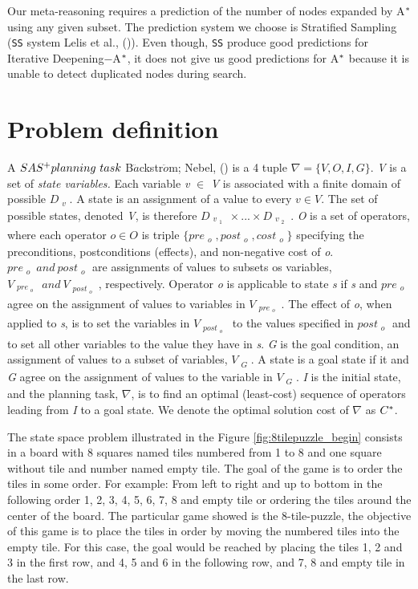 Our meta-reasoning requires a prediction of the number of nodes expanded by A$\sp{*}$ using any given subset. The prediction system we choose is Stratified Sampling (\texttt{SS} system Lelis et al., (\citeyear{lelis2013predicting})). Even though, \texttt{SS} produce good predictions for Iterative Deepening$-$A$\sp{*}$, it does not give us good predictions for A$\sp{*}$ because it is unable to detect duplicated nodes during search.

\section{Problem definition}

A $SAS\sp{+} planning\ task$ B$\ddot{a}$ckstr$\ddot{o}$m; Nebel, (\citeyear{backstrom1995complexity}) is a 4 tuple $\nabla = \{V, O, I, G\}.$ \textit{V} is a set of \textit{state variables.} Each variable \textit{v} $\in$ \textit{V} is associated with a finite domain of possible $D_{\substack{v}}$. A state is an assignment of a value to every $v \in V.$ The set of possible states, denoted \textit{V}, is therefore $D_{\substack{v_{\substack{1}}}}    \times ... \times D_{\substack{v_{\substack{2}}}}$. \textit{O} is a set of operators, where each operator $o \in O$ is triple $\{pre_{\substack{o}} , post_{\substack{o}}, cost_{\substack{o}}\}$ specifying the preconditions, postconditions (effects), and non-negative cost of \textit{o}. $pre_{\substack{o}}\ and\ post_{\substack{o}}$ are assignments of values to subsets os variables, $V_{\substack{pre_{\substack{o}}}}\ and\ V_{\substack{post_{\substack{o}}}}$, respectively. Operator \textit{o} is applicable to state \textit{s} if \textit{s} and $pre_{\substack{o}}$ agree on the assignment of values to variables in $V_{\substack{pre_{\substack{o}}}}$. The effect of \textit{o}, when applied to \textit{s}, is to set the variables in $V_{\substack{post_{\substack{o}}}}$ to the values specified in $post_{\substack{o}}$ and to set all other variables to the value they have in \textit{s}. \textit{G} is the goal condition, an assignment of values to a subset of variables, $V_{\substack{G}}$. A state is a goal state if it and \textit{G} agree on the assignment of values to the variable in $V_{\substack{G}}$. \textit{I} is the initial state, and the planning task, $\nabla$, is to find an optimal (least-cost) sequence of operators leading from \textit{I} to a goal state. We denote the optimal solution cost of $\nabla$ as $C\sp{*}$. 

The state space problem illustrated in the Figure \ref{fig:8tilepuzzle_begin} consists in a board with 8 squares named tiles numbered from 1 to 8 and one square without tile and number named empty tile. The goal of the game is to order the tiles in some order. For example: From left to right and up to bottom in the following order 1, 2, 3, 4, 5, 6, 7, 8 and empty tile or ordering the tiles around the center of the board. The particular game showed is the 8-tile-puzzle, the objective of this game is to place the tiles in order by moving the numbered tiles into the empty tile. For this case, the goal would be reached by placing the tiles 1, 2 and 3 in the first row, and 4, 5 and 6 in the following row, and 7, 8 and empty tile in the last row.

